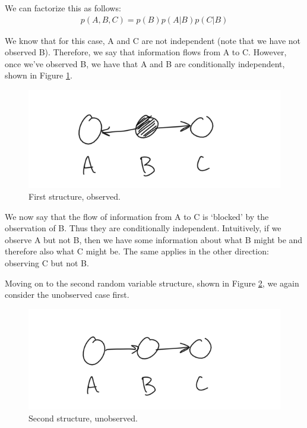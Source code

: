 We can factorize this as follows:
\begin{align*}
	p(A, B, C) = p(B) p(A | B) p(C | B)
\end{align*}

We know that for this case, A and C are not independent (note that we have not observed B). Therefore, we say that information flows from A to C. However, once we've observed B, we have that A and B are conditionally independent, shown in Figure \ref{fig:first-case-observed}.

\begin{figure}
	\centering
	\includegraphics[width=0.5\paperwidth]{../GraphicalModels/fig/first-case-observed.png}
	\caption{First structure, observed.}
	\label{fig:first-case-observed}
\end{figure}

We now say that the flow of information from A to C is `blocked' by the observation of B. Thus they are conditionally independent. Intuitively, if we observe A but not B, then we have some information about what B might be and therefore also what C might be. The same applies in the other direction: observing C but not B.

Moving on to the second random variable structure, shown in Figure \ref{fig:second-case-unobserved}, we again consider the unobserved case first.
\begin{figure}
	\centering
	\includegraphics[width=0.5\paperwidth]{../GraphicalModels/fig/second-case-unobserved.png}
	\caption{Second structure, unobserved.}
	\label{fig:second-case-unobserved}
\end{figure}

